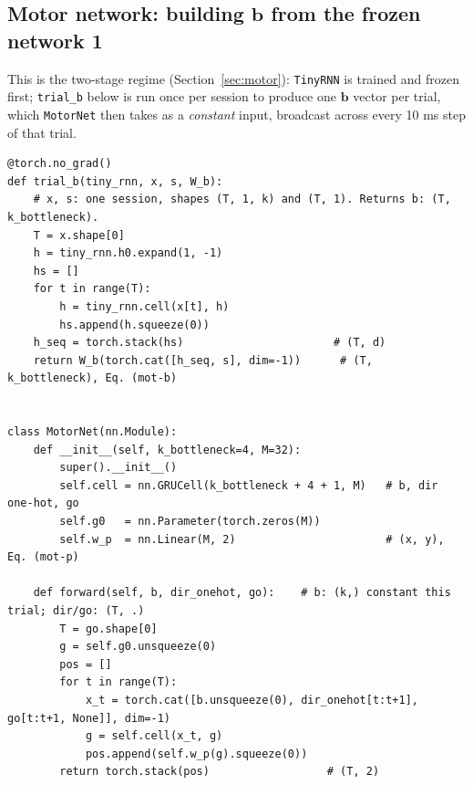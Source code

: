 \documentclass[11pt,a4paper]{article}
\newcommand{\vect}[1]{\bm{#1}}
\begin{document}
\subsection*{Motor network: building $\vect{b}$ from the frozen network 1}

This is the two-stage regime (Section~\ref{sec:motor}): \texttt{TinyRNN} is trained and
frozen first; \texttt{trial\_b} below is run once per session to produce one
$\vect{b}$ vector per trial, which \texttt{MotorNet} then takes as a \emph{constant}
input, broadcast across every 10 ms step of that trial.

\begin{lstlisting}
@torch.no_grad()
def trial_b(tiny_rnn, x, s, W_b):
    # x, s: one session, shapes (T, 1, k) and (T, 1). Returns b: (T, k_bottleneck).
    T = x.shape[0]
    h = tiny_rnn.h0.expand(1, -1)
    hs = []
    for t in range(T):
        h = tiny_rnn.cell(x[t], h)
        hs.append(h.squeeze(0))
    h_seq = torch.stack(hs)                       # (T, d)
    return W_b(torch.cat([h_seq, s], dim=-1))      # (T, k_bottleneck), Eq. (mot-b)


class MotorNet(nn.Module):
    def __init__(self, k_bottleneck=4, M=32):
        super().__init__()
        self.cell = nn.GRUCell(k_bottleneck + 4 + 1, M)   # b, dir one-hot, go
        self.g0   = nn.Parameter(torch.zeros(M))
        self.w_p  = nn.Linear(M, 2)                       # (x, y), Eq. (mot-p)

    def forward(self, b, dir_onehot, go):    # b: (k,) constant this trial; dir/go: (T, .)
        T = go.shape[0]
        g = self.g0.unsqueeze(0)
        pos = []
        for t in range(T):
            x_t = torch.cat([b.unsqueeze(0), dir_onehot[t:t+1], go[t:t+1, None]], dim=-1)
            g = self.cell(x_t, g)
            pos.append(self.w_p(g).squeeze(0))
        return torch.stack(pos)                  # (T, 2)
\end{lstlisting}
\end{document}
